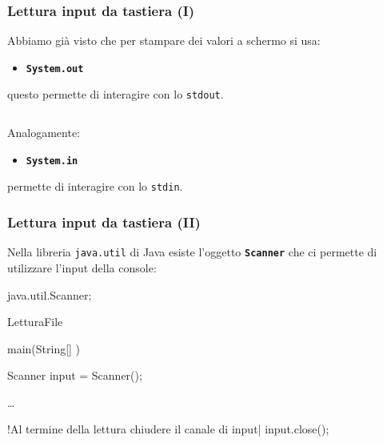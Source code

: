 
\begin{frame}[fragile]\frametitle{Lettura input da tastiera (I)}

  Abbiamo già visto che per stampare dei valori a schermo si usa:
  \begin{itemize}
    \item \texttt{\textbf{System.out}}
  \end{itemize}
  questo permette di interagire con lo \texttt{stdout}.
  
  ${}$

  Analogamente:
  \begin{itemize}
    \item \texttt{\textbf{System.in}}
  \end{itemize}
  permette di interagire con lo \texttt{stdin}.
  
% 

\end{frame}

\begin{frame}[fragile]\frametitle{Lettura input da tastiera (II)}
  Nella libreria \texttt{java.util} di Java esiste l'oggetto \texttt{\textbf{Scanner}} 
  che ci permette di utilizzare l’input della console:
  
  \begin{JavaCodePlain}[commandchars=\\!|]
  \Jimport java.util.Scanner;

  \Jpublic \Jclass LetturaFile {

    \Jpublic \Jstatic \Jvoid main(String[] \Jargs) {
      Scanner input = \Jnew Scanner(\JsystemIn);
    
      \dots
      
      \Jcomment!Al termine della lettura chiudere il canale di input|
      input.close();
    }
  }
  \end{JavaCodePlain}     

\end{frame}

